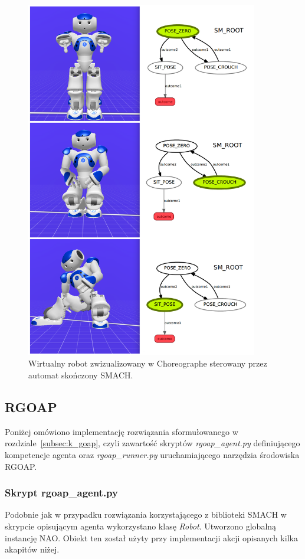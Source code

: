 \begin{figure}
\centering
\includegraphics[width=0.90\textwidth]{images/NaoSmachPoses.png}
\caption{Wirtualny robot zwizualizowany w Choreographe sterowany przez automat skończony SMACH.}
\label{fig:NAOsmach}
\end{figure}

\subsection{RGOAP}
\label{subsec:i_goap}

Poniżej omówiono implementację rozwiązania sformułowanego w rozdziale~\ref{subsec:k_goap}, czyli zawartość skryptów \textit{rgoap\_agent.py} definiującego kompetencje agenta oraz \textit{rgoap\_runner.py} uruchamiającego narzędzia środowiska RGOAP. 

\subsubsection{Skrypt rgoap\_agent.py}
Podobnie jak w przypadku rozwiązania korzystającego z biblioteki SMACH w skrypcie opisującym agenta wykorzystano klasę \textit{Robot}. Utworzono globalną instancję NAO. Obiekt ten został użyty przy implementacji akcji opisanych kilka akapitów niżej.

